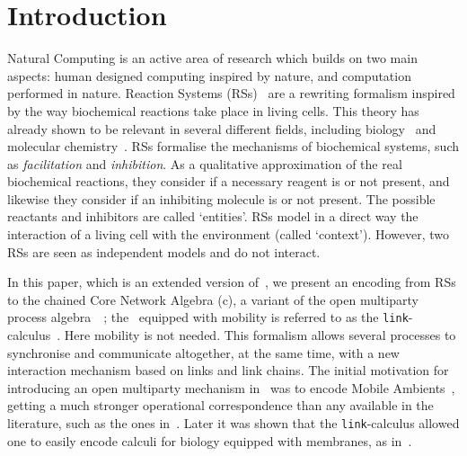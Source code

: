 
\section{Introduction}

Natural Computing is an active area of research which builds on two main 
aspects: human designed computing inspired by nature, and computation 
performed in nature. Reaction Systems (RSs)~\cite{BEMR11} are 
a rewriting formalism
inspired by the way biochemical reactions take place in living 
cells.  
This theory has already shown to be relevant in several different 
fields, 
including biology~\cite{ABP14,CMMBM12,Az17,BarbutiGLM16}
and molecular chemistry~\cite{OY16}.
RSs formalise the mechanisms of biochemical systems, 
such as {\em facilitation} and {\em inhibition}. 
As a qualitative approximation of the real biochemical reactions, they
consider if a necessary reagent is or not present, and likewise they
consider if an inhibiting molecule is or not present. 
The  possible reactants and inhibitors are called `entities'.
RSs model in a direct way the interaction of a living cell
with the environment (called `context'). However, two RSs are seen
as independent models and do not interact.


In this paper, which is an extended version of~\cite{BBF19},
we present an encoding
from RSs
to the chained Core Network  Algebra (c\CNA), a variant of the 
 open multiparty process algebra~\CNA~\cite{BBB17}; the \CNA~equipped with mobility is referred to as the {\tt link}-calculus~\cite{BodeiBB12,BODEI2020104587}.
 Here mobility is not needed.
This formalism allows several processes to synchronise and 
communicate altogether, at the same time, with a new interaction
mechanism based on links and link chains. 
The initial motivation for introducing
an open multiparty mechanism in~\cite{BodeiBB12}
was to encode
Mobile Ambients~\cite{CardelliG00}, getting a much stronger operational
correspondence than any available in the literature, such as the ones in~\cite{CZ07,B16}.
Later it was shown that the {\tt link}-calculus allowed one to easily encode calculi for biology equipped with membranes, as in~\cite{BodeiBBC14}.

